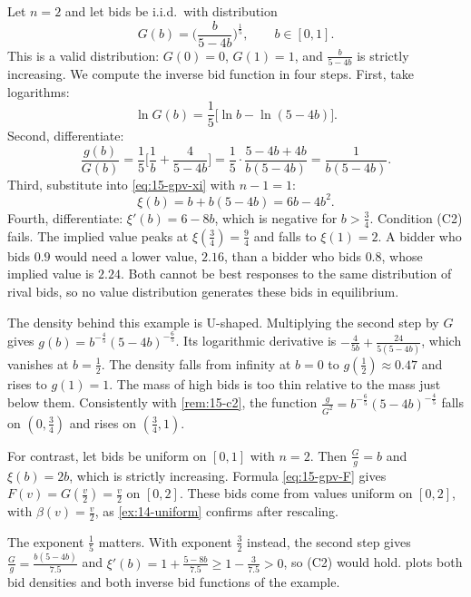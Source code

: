 \begin{example}\label{ex:15-gpv-counter}
Let $n=2$ and let bids be i.i.d.\ with distribution
\[
G(b)=\Big(\frac{b}{5-4b}\Big)^{\frac15},\qquad b\in[0,1].
\]
This is a valid distribution: $G(0)=0$, $G(1)=1$, and $\frac{b}{5-4b}$ is strictly increasing. We compute the inverse bid function in four steps. First, take logarithms:
\[
\ln G(b)=\frac15\Big[\ln b-\ln(5-4b)\Big].
\]
Second, differentiate:
\[
\frac{g(b)}{G(b)}=\frac15\Big[\frac1b+\frac{4}{5-4b}\Big]=\frac15\cdot\frac{5-4b+4b}{b(5-4b)}=\frac{1}{b(5-4b)}.
\]
Third, substitute into \eqref{eq:15-gpv-xi} with $n-1=1$:
\[
\xi(b)=b+b(5-4b)=6b-4b^2.
\]
Fourth, differentiate: $\xi'(b)=6-8b$, which is negative for $b>\frac34$. Condition (C2) fails. The implied value peaks at $\xi(\frac34)=\frac94$ and falls to $\xi(1)=2$. A bidder who bids $0.9$ would need a lower value, $2.16$, than a bidder who bids $0.8$, whose implied value is $2.24$. Both cannot be best responses to the same distribution of rival bids, so no value distribution generates these bids in equilibrium.

The density behind this example is U-shaped. Multiplying the second step by $G$ gives $g(b)=b^{-\frac45}(5-4b)^{-\frac65}$. Its logarithmic derivative is $-\frac{4}{5b}+\frac{24}{5(5-4b)}$, which vanishes at $b=\frac12$. The density falls from infinity at $b=0$ to $g(\frac12)\approx0.47$ and rises to $g(1)=1$. The mass of high bids is too thin relative to the mass just below them. Consistently with \cref{rem:15-c2}, the function $\frac{g}{G^2}=b^{-\frac65}(5-4b)^{-\frac45}$ falls on $(0,\frac34)$ and rises on $(\frac34,1)$.

For contrast, let bids be uniform on $[0,1]$ with $n=2$. Then $\frac{G}{g}=b$ and $\xi(b)=2b$, which is strictly increasing. Formula \eqref{eq:15-gpv-F} gives $F(v)=G(\frac v2)=\frac v2$ on $[0,2]$. These bids come from values uniform on $[0,2]$, with $\beta(v)=\frac v2$, as \cref{ex:14-uniform} confirms after rescaling.
\end{example}

The exponent $\frac15$ matters. With exponent $\frac32$ instead, the second step gives $\frac{G}{g}=\frac{b(5-4b)}{7.5}$ and $\xi'(b)=1+\frac{5-8b}{7.5}\ge1-\frac{3}{7.5}>0$, so (C2) would hold.  plots both bid densities and both inverse bid functions of the example.

